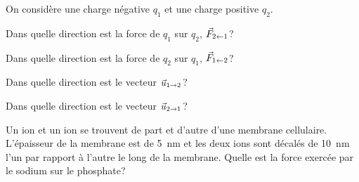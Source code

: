 \begin{diapobox}
  On considère une charge négative $q_1$ et une charge positive $q_2$.

  Dans quelle direction est la force de $q_1$ sur $q_2$, $\vec{F}_{2 \leftarrow 1}$?

  Dans quelle direction est la force de $q_2$ sur $q_1$, $\vec{F}_{1 \leftarrow 2}$?
  
  Dans quelle direction est le vecteur $\vec{u}_{1 \rightarrow 2}$?

  Dans quelle direction est le vecteur $\vec{u}_{2 \rightarrow 1}$?
\end{diapobox}


\begin{diapobox}
  Un ion  et un ion  se trouvent de part et d'autre
  d'une membrane cellulaire. L'épaisseur de la membrane est de \SI{5}{nm} et
  les deux ions sont décalés de \SI{10}{nm} l'un par rapport à l'autre le long
  de la membrane. Quelle est la force exercée par le sodium sur le phosphate?
\end{diapobox}

